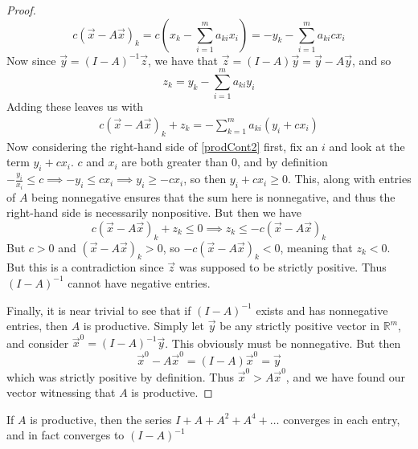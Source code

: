 \begin{proof}
\[ c(\vec{x} - A\vec{x})_k = c(x_k - \sum_{i=1}^m a_{ki}x_i) = -y_k - \sum_{i=1}^m a_{ki} cx_i \] 
Now since $\vec{y} = (I-A)^{-1}\vec{z}$, we have that $\vec{z} = (I-A)\vec{y} = \vec{y} - A\vec{y}$, and so 
\[ z_k = y_k - \sum_{i=1}^m a_{ki} y_i \]
Adding these leaves us with
\begin{align}
	c(\vec{x} - A\vec{x})_k+z_k = -\sum_{k=1}^m a_{ki}(y_i+cx_i) \label{prodCont2}
\end{align}
Now considering the right-hand side of \ref{prodCont2} first, fix an $i$ and look at the term $y_i+cx_i$. $c$ and $x_i$ are both greater than $0$, and by definition $-\frac{y_i}{x_i} \leq c \implies -y_i \leq cx_i \implies y_i \geq -cx_i$, so then $y_i+cx_i \geq 0$. This, along with entries of $A$ being nonnegative ensures that the sum here is nonnegative, and thus the right-hand side is necessarily nonpositive. But then we have
\[ c(\vec{x} - A\vec{x})_k+z_k \leq 0 \implies z_k \leq -c(\vec{x} - A\vec{x})_k \]
But $c > 0$ and $(\vec{x} - A\vec{x})_k > 0$, so $-c(\vec{x} - A\vec{x})_k < 0$, meaning that $z_k < 0$. But this is a contradiction since $\vec{z}$ was supposed to be strictly positive. Thus $(I-A)^{-1}$ cannot have negative entries. \par 
Finally, it is near trivial to see that if $(I-A)^{-1}$ exists and has nonnegative entries, then $A$ is productive. Simply let $\vec{y}$ be any strictly positive vector in $\mathbb{R}^m$, and consider $\vec{x}^0 = (I-A)^{-1}\vec{y}$. This obviously must be nonnegative. But then 
\[ \vec{x}^0 - A\vec{x}^0 = (I-A)\vec{x}^0 = \vec{y} \]
which was strictly positive by definition. Thus $\vec{x}^0 > A\vec{x}^0$, and we have found our vector witnessing that $A$ is productive. 
\end{proof}
\begin{theorem}
	 If $A$ is productive, then the series $I+A+A^2+A^4 + \ldots$ converges in each entry, and in fact converges to $(I-A)^{-1}$ 
\end{theorem}
